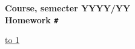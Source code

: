 \documentclass[14pt]{extarticle}
\def\t{\texttt}               %
\def\NO{\t{\#}}               %
\def\LINE{\vspace*{-1em}\noindent \underline{\hbox to 1\textwidth{{ } \hfil{ } \hfil{ } }}}
\begin{document}
\renewcommand{\dateseparator}{--}
\begin{center}
    {\Large\bf
        Course, semecter YYYY/YY\\
        Homework \NO \\
    }
\end{center}

\vspace{-1em}
\LINE
\vspace{1em}


\pagestyle{fancy}
\end{document}
